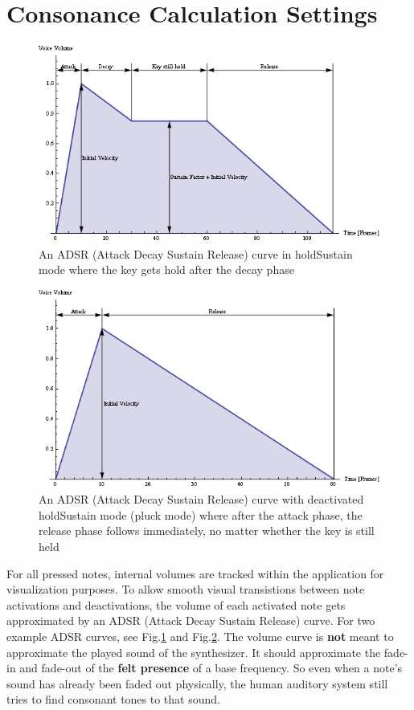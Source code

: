 \documentclass[12pt,a4paper,titlepage,oneside]{report}
\begin{document}
\section{Consonance Calculation Settings}
\label{sec:ADSR}

\begin{figure}[!ht]
\includegraphics[width=\textwidth]{images/adsr_hold.png}
\centering
\caption{An ADSR (Attack Decay Sustain Release) curve in holdSustain mode where the key gets hold after the decay phase}
\label{fig:adsr_hold}
\end{figure}

\begin{figure}[!ht]
\includegraphics[width=\textwidth]{images/adsr_nohold.png}
\centering
\caption{An ADSR (Attack Decay Sustain Release) curve with deactivated holdSustain mode (pluck mode) where after the attack phase, the release phase follows immediately, no matter whether the key is still held}
\label{fig:adsr_nohold}
\end{figure}

For all pressed notes, internal volumes are tracked within the application for visualization purposes. To allow smooth visual transistions between note activations and deactivations, the volume of each activated note gets approximated by an ADSR (Attack Decay Sustain Release) curve. For two example ADSR curves, see Fig.\ref{fig:adsr_hold} and Fig.\ref{fig:adsr_nohold}. The volume curve is \textbf{not} meant to approximate the played sound of the synthesizer. It should approximate the fade-in and fade-out of the \textbf{felt presence} of a base frequency. So even when a note's sound has already been faded out physically, the human auditory system still tries to find consonant tones to that sound.
\end{document}
